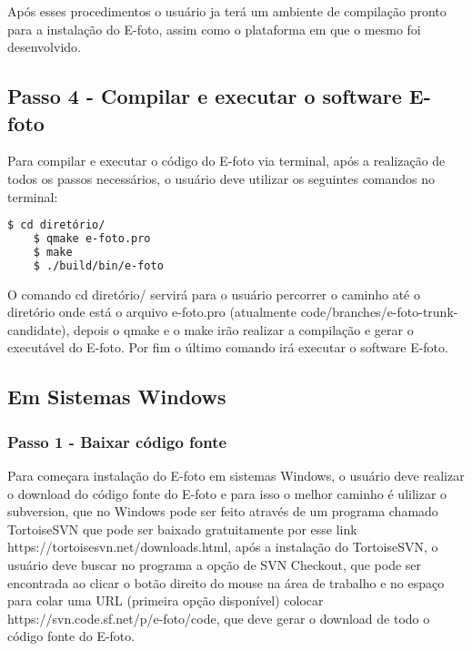 Após esses procedimentos o usuário ja terá um ambiente de compilação pronto para a instalação do E-foto, assim como o plataforma em que o mesmo foi desenvolvido.
    
\subsection{Passo 4 - Compilar e executar o software E-foto}
Para compilar e executar o código do E-foto via terminal, após a realização de todos os passos necessários, o usuário deve utilizar os seguintes comandos no terminal:
\begin{lstlisting}[language=bash]
   	$ cd diretório/
   	$ qmake e-foto.pro
   	$ make
   	$ ./build/bin/e-foto
\end{lstlisting}
   
O comando cd diretório/ servirá para o usuário percorrer o caminho até o diretório onde está o arquivo e-foto.pro (atualmente code/branches/e-foto-trunk-candidate), depois o qmake e o make irão realizar a compilação e gerar o executável do E-foto. Por fim o último comando irá executar o software E-foto.
   

\subsection{Em Sistemas Windows}

\subsubsection{Passo 1 - Baixar código fonte}
 Para começara instalação do E-foto em sistemas Windows, o usuário deve realizar o download do código fonte do E-foto e para isso o melhor caminho é ulilizar o subversion, que no Windows pode ser feito através de um programa chamado TortoiseSVN que pode ser baixado gratuitamente por esse link https://tortoisesvn.net/downloads.html, após a instalação do TortoiseSVN, o usuário deve buscar no programa a opção de SVN Checkout, que pode ser encontrada ao clicar o botão direito do mouse na área de trabalho e no espaço para colar uma URL (primeira opção disponível) colocar https://svn.code.sf.net/p/e-foto/code, que deve gerar o download de todo o código fonte do E-foto.
 
